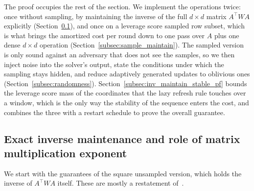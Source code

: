 \documentclass[11pt]{article}
\begin{document}
The proof occupies the rest of the section.
We implement the operations twice: once without sampling, by maintaining the
inverse of the full $d \times d$ matrix
$A^\top W A$ explicitly (Section~\ref{subsec:exact_maintain}), and once on a
leverage score sampled row subset, which is what brings the amortized cost per
round down to one pass over $A$ plus one dense
$d \times d$ operation (Section~\ref{subsec:sample_maintain}).
The sampled version is only sound against an adversary that does not see the
samples, so we then inject noise into the solver's output, state the conditions
under which the sampling stays hidden, and reduce adaptively generated updates
to oblivious ones (Section~\ref{subsec:randomness}).
Section~\ref{subsec:inv_maintain_stable_pf} bounds the leverage score mass of
the coordinates that the lazy refresh rule touches over a window, which is the
only way the stability of the sequence enters the cost, and combines the three
with a restart schedule to prove the overall guarantee.

\subsection{Exact inverse maintenance and role of matrix
multiplication exponent}
\label{subsec:exact_maintain}

We start with the guarantees of the square unsampled version, which holds the
inverse of $A^\top W A$ itself.
These are mostly a restatement of~\cite{GPV23}.
\end{document}
